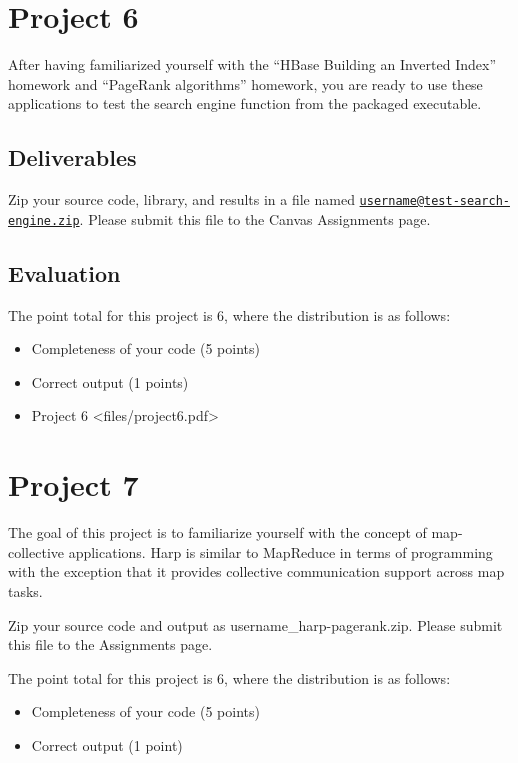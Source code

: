 \chapter{Project 6}\label{project-6}

After having familiarized yourself with the ``HBase Building an Inverted
Index'' homework and ``PageRank algorithms'' homework, you are ready to
use these applications to test the search engine function from the
packaged executable.

\section{Deliverables}\label{deliverables}

Zip your source code, library, and results in a file named
\href{mailto:username@test-search-engine.zip}{\nolinkurl{username@test-search-engine.zip}}.
Please submit this file to the Canvas Assignments page.

\section{Evaluation}\label{evaluation}

The point total for this project is 6, where the distribution is as
follows:

\begin{itemize}
\tightlist
\item
  Completeness of your code (5 points)
\item
  Correct output (1 points)
\item
  Project 6 \textless{}files/project6.pdf\textgreater{}
\end{itemize}

\chapter{Project 7}\label{project-7}

The goal of this project is to familiarize yourself with the concept of
map-collective applications. Harp is similar to MapReduce in terms of
programming with the exception that it provides collective communication
support across map tasks.

Zip your source code and output as username\_harp-pagerank.zip. Please
submit this file to the Assignments page.

The point total for this project is 6, where the distribution is as
follows:

\begin{itemize}
\tightlist
\item
  Completeness of your code (5 points)
\item
  Correct output (1 point)
\end{itemize}


